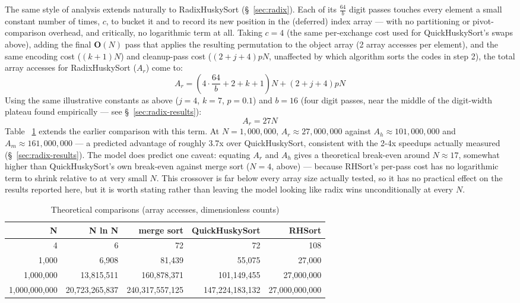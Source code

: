 \documentclass[twoside,leqno,twocolumn]{article}
\begin{document}
The same style of analysis extends naturally to RadixHuskySort (\S~\ref{sec:radix}).
Each of its $\frac{64}{b}$ digit passes touches every element a small constant number of times,
$c$, to bucket it and to record its new position in the (deferred) index array —
with no partitioning or pivot-comparison overhead, and critically, no logarithmic term at all.
Taking $c = 4$ (the same per-exchange cost used for QuickHuskySort's swaps above),
adding the final $\textbf{O}(N)$ pass that applies the resulting permutation to the object array (2 array accesses per element),
and the same encoding cost ($(k+1)N$) and cleanup-pass cost ($(2 + j + 4)pN$,
unaffected by which algorithm sorts the codes in step 2), the total array accesses for RadixHuskySort ($A_r$) come to:
\[A_r = \left(4 \cdot \frac{64}{b} + 2 + k + 1\right) N + (2 + j + 4)pN\]
Using the same illustrative constants as above ($j = 4$, $k = 7$, $p = 0.1$)
and $b = 16$ (four digit passes, near the middle of the digit-width plateau found empirically —
see \S~\ref{sec:radix-results}):
\[A_r = 27 N\]
Table ~\ref{tab:Comparison} extends the earlier comparison with this term.
At $N = 1{,}000{,}000$, $A_r \approx 27{,}000{,}000$ against $A_h \approx 101{,}000{,}000$ and $A_m \approx 161{,}000{,}000$ —
a predicted advantage of roughly 3.7x over QuickHuskySort,
consistent with the 2-4x speedups actually measured (\S~\ref{sec:radix-results}).
The model does predict one caveat:
equating $A_r$ and $A_h$ gives a theoretical break-even around $N \approx 17$,
somewhat higher than QuickHuskySort's own break-even against merge sort ($N = 4$,
above) — because RHSort's per-pass cost has no logarithmic term to shrink relative to at very small $N$.
This crossover is far below every array size actually tested, so it has no practical effect on the results reported here,
but it is worth stating rather than leaving the model looking like radix wins unconditionally at every $N$.
 \begin{table}
  \caption{Theoretical comparisons (array accesses, dimensionless counts)}
  \label{tab:Comparison}
  \begin{tabular}{rrrrr}
    \toprule
    N  &  N ln N & merge sort & QuickHuskySort & RHSort \\
    \midrule
     4 & 6 & 72 & 72 & 108 \\
     1,000 & 6,908 & 81,439 & 55,075 & 27,000 \\
     1,000,000 & 13,815,511 & 160,878,371 & 101,149,455 & 27,000,000 \\
     1,000,000,000 & 20,723,265,837 & 240,317,557,125 & 147,224,183,132 & 27,000,000,000 \\

    \bottomrule
  \end{tabular}
\end{table}
\end{document}
